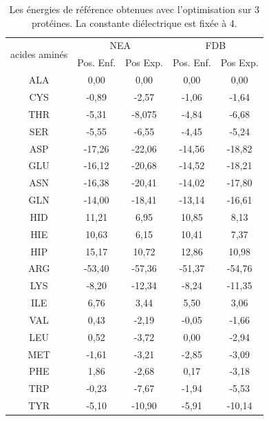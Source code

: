     \begin{table}[!htbp]
      \centering
      \caption{Les énergies de référence obtenues avec l'optimisation sur 3 protéines. La constante diélectrique est fixée à 4.}
      \begin{tabular}{ccc|cc}

        \toprule
        \multirow{2}{*}{acides aminés}  & \multicolumn{2}{c|}{NEA} & \multicolumn{2}{c}{FDB} \\
        \cmidrule{2-5}
         & Pos. Enf. & Pos Exp. & Pos. Enf. & Pos Exp. \\
        \cmidrule{1-5}

        ALA &   0,00     &  0,00    &   0,00  &   0,00       \\
        CYS &  -0,89     &  -2,57   &  -1,06  &   -1,64      \\
        THR &  -5,31     &  -8,075  &  -4,84  &   -6,68      \\
        SER &  -5,55     &  -6,55   &  -4,45  &   -5,24      \\
        ASP &  -17,26    &  -22,06  &  -14,56 &   -18,82     \\
        GLU &  -16,12    &  -20,68  &  -14,52 &   -18,21     \\
        ASN &  -16,38    &  -20,41  &  -14,02 &   -17,80     \\
        GLN &  -14,00    &  -18,41  &  -13,14 &   -16,61     \\
        HID &   11,21    &  6,95    &  10,85  &   8,13       \\
        HIE &   10,63    &  6,15    &  10,41  &   7,37       \\
        HIP &   15,17    &  10,72   &  12,86  &   10,98      \\
        ARG &  -53,40    &  -57,36  &  -51,37 &   -54,76     \\
        LYS &  -8,20     &  -12,34  &  -8,24  &   -11,35     \\
        ILE &   6,76     &  3,44    &  5,50   &   3,06       \\
        VAL &   0,43     &  -2,19   &  -0,05  &   -1,66      \\
        LEU &   0,52     &  -3,72   &  0,00   &   -2,94      \\
        MET &  -1,61     &  -3,21   &  -2,85  &   -3,09      \\
        PHE &   1,86     &  -2,68   &  0,17   &   -3,18      \\
        TRP &  -0,23     &  -7,67   &  -1,94  &   -5,53      \\
        TYR &  -5,10     &  -10,90  &  -5,91  &   -10,14     \\

        \bottomrule

      \end{tabular}      

\label{tab:RefEner3prot}      
    \end{table}

